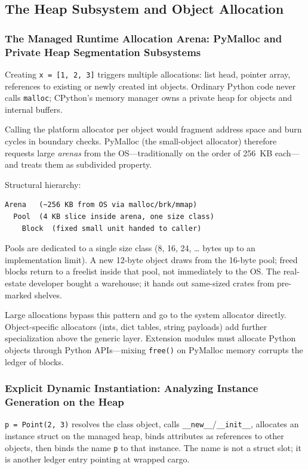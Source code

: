 \subsection{The Heap Subsystem and Object Allocation}

\subsubsection{The Managed Runtime Allocation Arena: PyMalloc and Private Heap Segmentation Subsystems}

Creating \texttt{x = [1, 2, 3]} triggers multiple allocations: list head, pointer array, references to existing or newly created int objects. Ordinary Python code never calls \texttt{malloc}; CPython's memory manager owns a private heap for objects and internal buffers.

Calling the platform allocator per object would fragment address space and burn cycles in boundary checks. PyMalloc (the small-object allocator) therefore requests large \emph{arenas} from the OS---traditionally on the order of 256~KB each---and treats them as subdivided property.

Structural hierarchy:

\begin{verbatim}
Arena   (~256 KB from OS via malloc/brk/mmap)
  Pool  (4 KB slice inside arena, one size class)
    Block  (fixed small unit handed to caller)
\end{verbatim}

Pools are dedicated to a single size class (8, 16, 24, \ldots{} bytes up to an implementation limit). A new 12-byte object draws from the 16-byte pool; freed blocks return to a freelist inside that pool, not immediately to the OS. The real-estate developer bought a warehouse; it hands out same-sized crates from pre-marked shelves.

Large allocations bypass this pattern and go to the system allocator directly. Object-specific allocators (ints, dict tables, string payloads) add further specialization above the generic layer. Extension modules must allocate Python objects through Python APIs---mixing \texttt{free()} on PyMalloc memory corrupts the ledger of blocks.

\subsubsection{Explicit Dynamic Instantiation: Analyzing Instance Generation on the Heap}

\texttt{p = Point(2, 3)} resolves the class object, calls \texttt{\_\_new\_\_}/\texttt{\_\_init\_\_}, allocates an instance struct on the managed heap, binds attributes as references to other objects, then binds the name \texttt{p} to that instance. The name is not a struct slot; it is another ledger entry pointing at wrapped cargo.

